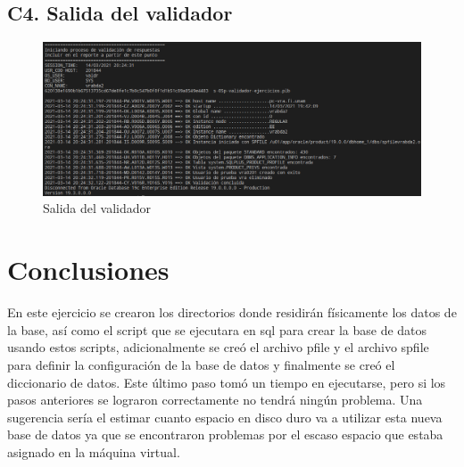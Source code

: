 \documentclass[journal]{IEEEtran}
\begin{document}
\subsection{C4.  Salida del validador}
\begin{figure}[H]
  \centering
  \includegraphics[scale=.21]{validador_ej3_t2.png}
   \caption{Salida del validador}
   \label{fig:salidascript}
\end{figure}
\section{Conclusiones}
En este ejercicio se crearon los directorios donde residirán físicamente los datos de la base,
así como el script que se ejecutara en sql para crear la base de datos usando estos scripts,
adicionalmente se creó el archivo pfile y el archivo spfile para definir la configuración de 
la base de datos y finalmente se creó el diccionario de datos. Este último paso tomó un tiempo 
en ejecutarse, pero si los pasos anteriores se lograron correctamente no tendrá ningún problema.
Una sugerencia sería el estimar cuanto espacio en disco duro va a utilizar esta nueva base de datos 
ya que se encontraron problemas por el escaso espacio que estaba asignado en la máquina virtual.
\ifCLASSOPTIONcaptionsoff
  \newpage

\fi
\end{document}
